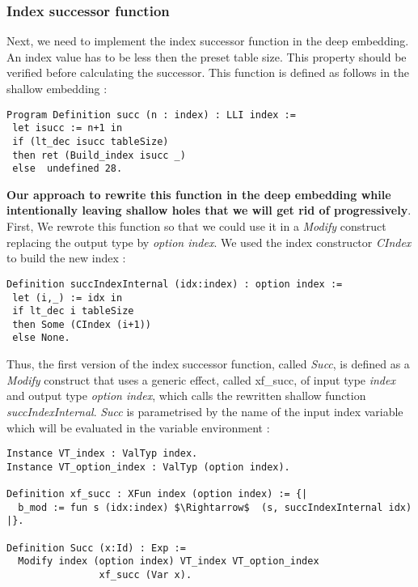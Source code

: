\subsubsection{Index successor function}
Next, we need to implement the index successor function in the deep embedding. An index value has to be less then the preset table size. This property should be verified before calculating the successor. This function is defined as follows in the shallow embedding :
\begin{lstlisting}[caption = {Index successor function in the shallow embedding},xleftmargin=.04\textwidth,
xrightmargin=.04\textwidth]
Program Definition succ (n : index) : LLI index :=
 let isucc := n+1 in
 if (lt_dec isucc tableSize)
 then ret (Build_index isucc _)
 else  undefined 28.
\end{lstlisting} \vspace{4pt}
\textbf{Our approach to rewrite this function in the deep embedding while intentionally leaving shallow holes that we will get rid of progressively}. First, We rewrote this function so that we could use it in a \textit{Modify} construct replacing the output type by \textit{option index}. We used the index constructor \textit{CIndex} to build the new index : 
\begin{lstlisting}[caption={Rewritten shallow index successor function},xleftmargin=-.01\textwidth,
xrightmargin=-.01\textwidth,label={succInt}]
Definition succIndexInternal (idx:index) : option index :=
 let (i,_) := idx in 
 if lt_dec i tableSize 
 then Some (CIndex (i+1)) 
 else None.
\end{lstlisting} \vspace{4pt}
Thus, the first version of the index successor function, called \textit{Succ}, is defined as a \textit{Modify} construct that uses a generic effect, called xf\_succ, of input type \textit{index} and output type \textit{option index}, which calls the rewritten shallow function \textit{succIndexInternal}. \textit{Succ} is parametrised by the name of the input index variable which will be evaluated in the variable environment : 
\begin{lstlisting}[caption = {Definition of Succ},xleftmargin=-.02\textwidth,
xrightmargin=-.02\textwidth, mathescape=true,label={SuccFn}]
Instance VT_index : ValTyp index.
Instance VT_option_index : ValTyp (option index).

Definition xf_succ : XFun index (option index) := {|
  b_mod := fun s (idx:index) $\Rightarrow$  (s, succIndexInternal idx)
|}.

Definition Succ (x:Id) : Exp :=
  Modify index (option index) VT_index VT_option_index 
  	            xf_succ (Var x).
\end{lstlisting} \vspace{4pt}

